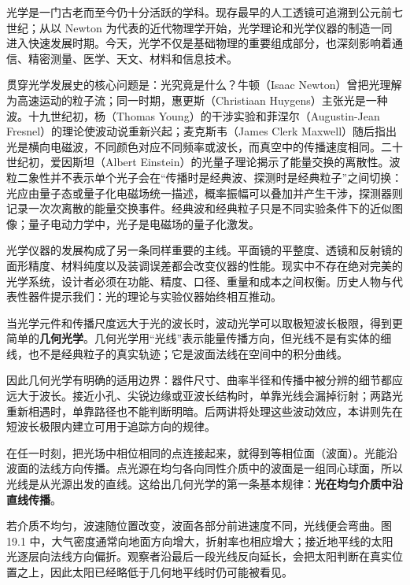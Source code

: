 光学是一门古老而至今仍十分活跃的学科。现存最早的人工透镜可追溯到公元前七世纪；从以 Newton 为代表的近代物理学开始，光学理论和光学仪器的制造一同进入快速发展时期。今天，光学不仅是基础物理的重要组成部分，也深刻影响着通信、精密测量、医学、天文、材料和信息技术。

贯穿光学发展史的核心问题是：光究竟是什么？牛顿（Isaac Newton）曾把光理解为高速运动的粒子流；同一时期，惠更斯（Christiaan Huygens）主张光是一种波。十九世纪初，杨（Thomas Young）的干涉实验和菲涅尔（Augustin-Jean Fresnel）的理论使波动说重新兴起；麦克斯韦（James Clerk Maxwell）随后指出光是横向电磁波，不同颜色对应不同频率或波长，而真空中的传播速度相同。二十世纪初，爱因斯坦（Albert Einstein）的光量子理论揭示了能量交换的离散性。波粒二象性并不表示单个光子会在“传播时是经典波、探测时是经典粒子”之间切换：光应由量子态或量子化电磁场统一描述，概率振幅可以叠加并产生干涉，探测器则记录一次次离散的能量交换事件。经典波和经典粒子只是不同实验条件下的近似图像；量子电动力学中，光子是电磁场的量子化激发。


光学仪器的发展构成了另一条同样重要的主线。平面镜的平整度、透镜和反射镜的面形精度、材料纯度以及装调误差都会改变仪器的性能。现实中不存在绝对完美的光学系统，设计者必须在功能、精度、口径、重量和成本之间权衡。历史人物与代表性器件提示我们：光的理论与实验仪器始终相互推动。


当光学元件和传播尺度远大于光的波长时，波动光学可以取极短波长极限，得到更简单的\textbf{几何光学}。几何光学用“光线”表示能量传播方向，但光线不是有实体的细线，也不是经典粒子的真实轨迹；它是波面法线在空间中的积分曲线。

因此几何光学有明确的适用边界：器件尺寸、曲率半径和传播中被分辨的细节都应远大于波长。接近小孔、尖锐边缘或亚波长结构时，单靠光线会漏掉衍射；两路光重新相遇时，单靠路径也不能判断明暗。后两讲将处理这些波动效应，本讲则先在短波长极限内建立可用于追踪方向的规律。

在任一时刻，把光场中相位相同的点连接起来，就得到等相位面（波面）。光能沿波面的法线方向传播。点光源在均匀各向同性介质中的波面是一组同心球面，所以光线是从光源出发的直线。这给出几何光学的第一条基本规律：\textbf{光在均匀介质中沿直线传播}。

若介质不均匀，波速随位置改变，波面各部分前进速度不同，光线便会弯曲。图 19.1 中，大气密度通常向地面方向增大，折射率也相应增大；接近地平线的太阳光逐层向法线方向偏折。观察者沿最后一段光线反向延长，会把太阳判断在真实位置之上，因此太阳已经略低于几何地平线时仍可能被看见。

